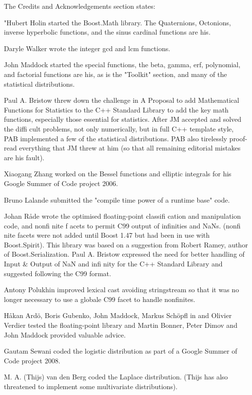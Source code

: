 \vpara
The Credits and Acknowledgements section states:

\vpara
"Hubert Holin started the Boost.Math library. The Quaternions, Octonions, inverse hyperbolic functions, and the sinus cardinal functions are his.

\vpara
Daryle Walker wrote the integer gcd and lcm functions.

\vpara
John Maddock started the special functions, the beta, gamma, erf, polynomial, and factorial functions are his, as is the "Toolkit" section, and many of the statistical distributions.

\vpara
Paul A. Bristow threw down the challenge in A Proposal to add Mathematical Functions for Statistics to the C++ Standard Library to add the key math functions, especially those essential for statistics. After JM accepted and solved the diffi cult problems, not only numerically, but in full C++ template style, PAB implemented a few of the statistical distributions. PAB also tirelessly proof-read everything that JM threw at him (so that all remaining editorial mistakes are his fault).

\vpara
Xiaogang Zhang worked on the Bessel functions and elliptic integrals for his Google Summer of Code project 2006.

\vpara
Bruno Lalande submitted the "compile time power of a runtime base" code.

\vpara
Johan Råde wrote the optimised floating-point classifi cation and manipulation code, and nonfi nite f acets to permit C99 output of infinities and NaNs. (nonfi nite facets were not added until Boost 1.47 but had been in use with Boost.Spirit). This library was based on a suggestion from Robert Ramey, author of Boost.Serialization. Paul A. Bristow expressed the need for better handling of Input \& Output of NaN and infi nity for the C++ Standard Library  and suggested following the C99 format.

\vpara
Antony Polukhin improved lexical cast avoiding stringstream so that it was no longer necessary to use a globale C99 facet to handle nonfinites.

\vpara
Håkan Ardö, Boris Gubenko, John Maddock, Markus Schöpfl in and Olivier Verdier tested the floating-point library and Martin Bonner, Peter Dimov and John Maddock provided valuable advice.

\vpara
Gautam Sewani coded the logistic distribution as part of a Google Summer of Code project 2008.

\vpara
M. A. (Thijs) van den Berg coded the Laplace distribution. (Thijs has also threatened to implement some multivariate distributions).

